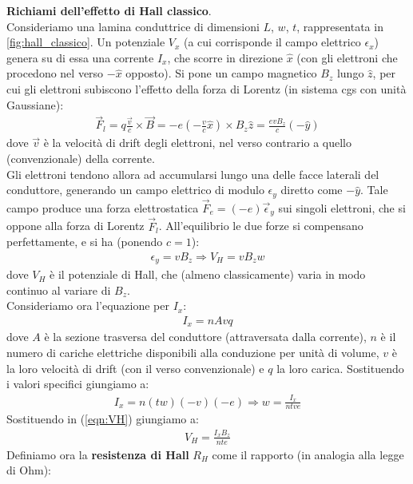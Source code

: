\documentclass[../../FisicaTeorica.tex]{subfiles}
\begin{document}
\begin{expl}
\textbf{Richiami dell'effetto di Hall classico}.\\
Consideriamo una lamina conduttrice di dimensioni $L$, $w$, $t$, rappresentata in \ref{fig:hall_classico}. Un potenziale $V_x$ (a cui corrisponde il campo elettrico $\epsilon_x$) genera su di essa una corrente $I_x$, che scorre in direzione $\hat{x}$ (con gli elettroni che procedono nel verso $-\hat{x}$ opposto). Si pone un campo magnetico $B_z$ lungo $\hat{z}$, per cui gli elettroni subiscono l'effetto della forza di Lorentz (in sistema cgs con unità Gaussiane):
\begin{align*}
\vec{F}_l = q\frac{\vec{v}}{c}\times \vec{B} = -e\left(-\frac{v}{c}\hat{x}\right)\times B_z\hat{z} = \frac{evB_z}{c}(-\hat{y})
\end{align*}
dove $\vec{v}$ è la velocità di drift degli elettroni, nel verso contrario a quello (convenzionale) della corrente.\\
Gli elettroni tendono allora ad accumularsi lungo una delle facce laterali del conduttore, generando un campo elettrico di modulo $\epsilon_y$ diretto come $-\hat{y}$. Tale campo produce una forza elettrostatica $\vec{F}_e=(-e)\vec{\epsilon}_y$ sui singoli elettroni, che si oppone alla forza di Lorentz $\vec{F}_l$. All'equilibrio le due forze si compensano perfettamente, e si ha (ponendo $c=1$):
\begin{align}
\epsilon_y = vB_z \Rightarrow V_H = vB_z w
\label{eqn:VH}
\end{align} 
dove $V_H$ è il potenziale di Hall, che (almeno classicamente) varia in modo continuo al variare di $B_z$.\\
Consideriamo ora l'equazione per $I_x$:
\begin{align*}
I_x = n A v q
\end{align*}
dove $A$ è la sezione trasversa del conduttore (attraversata dalla corrente), $n$ è il numero di cariche elettriche disponibili alla conduzione per unità di volume, $v$ è la loro velocità di drift (con il verso convenzionale) e $q$ la loro carica. Sostituendo i valori specifici giungiamo a:
\begin{align*}
I_x = n (tw)(-v)(-e)\Rightarrow w =\frac{I_x}{ntve}
\end{align*}
Sostituendo in (\ref{eqn:VH}) giungiamo a:
\begin{align*}
V_H = \frac{I_x B_z}{nte}
\end{align*}
Definiamo ora la \textbf{resistenza di Hall} $R_H$ come il rapporto (in analogia alla legge di Ohm):

\end{expl}
\end{document}
